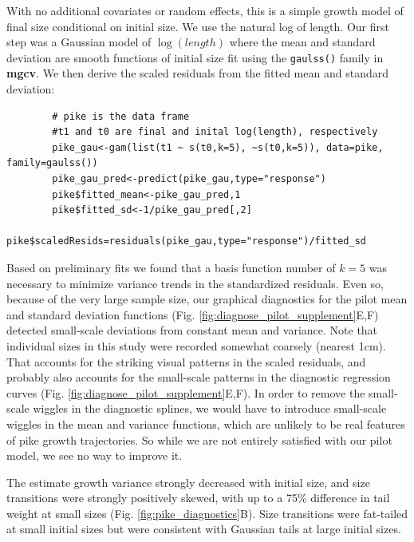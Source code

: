 \documentclass[12pt]{article}
\begin{document}
\begin{spacing}{1.35}
	With no additional covariates or random effects, this is a simple growth model of final size conditional on initial size. 
	We use the natural log of length. 
	Our first step was a Gaussian model of $\log(length)$ where the mean and standard deviation are smooth functions of initial size fit using the \texttt{gaulss()} family in \textbf{mgcv}. 
	We then derive the scaled residuals from the fitted mean and standard deviation:
	\begin{lstlisting}
		# pike is the data frame
		#t1 and t0 are final and inital log(length), respectively
		pike_gau<-gam(list(t1 ~ s(t0,k=5), ~s(t0,k=5)), data=pike, family=gaulss())
		pike_gau_pred<-predict(pike_gau,type="response")
		pike$fitted_mean<-pike_gau_pred,1
		pike$fitted_sd<-1/pike_gau_pred[,2]
		pike$scaledResids=residuals(pike_gau,type="response")/fitted_sd
	\end{lstlisting}
	Based on preliminary fits we found that a basis function number of $k=5$ was necessary to minimize variance trends in the standardized residuals. Even so, because of the very large sample size, our graphical diagnostics for the
	pilot mean and standard deviation functions (Fig. \ref{fig:diagnose_pilot_supplement}E,F) detected small-scale 
	deviations from constant mean and variance. Note that individual sizes in this study were recorded somewhat coarsely 
	(nearest 1cm). That accounts for the striking visual patterns in the scaled residuals, and probably also 
	accounts for the small-scale patterns in the diagnostic regression curves (Fig. \ref{fig:diagnose_pilot_supplement}E,F). 
	In order to remove the small-scale wiggles in the diagnostic splines, we would have to introduce
	small-scale wiggles in the mean and variance functions, which are unlikely to be real features of pike growth
	trajectories. So while we are not entirely satisfied with our pilot model, we see no way to improve it.
	
	The estimate growth variance strongly decreased with initial size, and size transitions were strongly positively skewed, with up to a 75\% difference in tail weight at small sizes (Fig. \ref{fig:pike_diagnostics}B). 
	Size transitions were fat-tailed at small initial sizes but were consistent with Gaussian tails at large initial sizes. 
	

\end{spacing}
\end{document}
